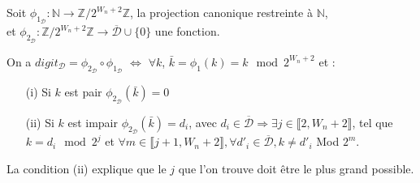 \documentclass[12pt, a4paper]{memoir}
\begin{document}
\begin{Propriété}
 Soit $\phi_{1_\mathcal{D}} : \mathbb{N} \rightarrow \mathbb{Z} / 2^{W_n+2} \mathbb{Z}$, la projection canonique restreinte à $\mathbb{N}$, \\ 
 et $\phi_{2_\mathcal{D}} : \mathbb{Z} / 2^{W_n+2} \mathbb{Z} \rightarrow \overline{\mathcal{D}} \cup \{0\}$ une fonction.
 
 On a $digit_{\mathcal{D}} = \phi_{2_\mathcal{D}} \circ \phi_{1_\mathcal{D}}$ $\iff$
 $\forall k$, $\bar{k} = \phi_1(k) = k \mod 2^{W_n+2}$ et : \\
 \begin{itemize}
  \item [(i)] Si $k$ est pair $\phi_{2_\mathcal{D}}(\bar{k}) = 0$
  \item [(ii)] Si $k$ est impair $\phi_{2_\mathcal{D}}(\bar{k}) = d_i$, avec $d_i \in \overline{\mathcal{D}} 
  \Rightarrow \exists j \in \llbracket 2,W_n+2 \rrbracket$,
 tel que $k = d_i \mod 2^j$ et $\forall m \in \llbracket j+1,W_n+2 \rrbracket, \forall d'_i \in \overline{\mathcal{D}}, k \neq d'_i$ Mod $2^m$.
 \end{itemize}
\end{Propriété}

\begin{Remarque}
 La condition (ii) explique que le $j$ que l'on trouve doit être le plus grand possible. 
\end{Remarque}
\end{document}
